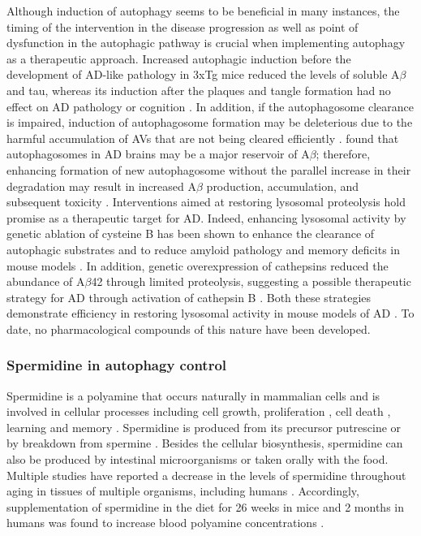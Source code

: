 Although induction of autophagy seems to be beneficial in many instances, the timing of the intervention in the disease progression as well as point of dysfunction in the autophagic pathway is crucial when implementing autophagy as a therapeutic approach. Increased autophagic induction before the development of AD-like pathology in 3xTg mice reduced the levels of soluble A$\beta$ and tau, whereas its induction after the plaques and tangle formation had no effect on AD pathology or cognition \citep{Majumder2011}. In addition, if the autophagosome clearance is impaired, induction of autophagosome formation may be deleterious due to the harmful accumulation of AVs that are not being cleared efficiently \citep{Liang2014}. \citet{Yu2005} found that autophagosomes in AD brains may be a major reservoir of A$\beta$; therefore, enhancing formation of new autophagosome without the parallel increase in their degradation may result in increased A$\beta$ production, accumulation, and subsequent toxicity \citep{Nixon2007}. Interventions aimed at restoring lysosomal proteolysis hold promise as a therapeutic target for AD. Indeed, enhancing lysosomal activity by genetic ablation of cysteine B has been shown to enhance the clearance of autophagic substrates and to reduce amyloid pathology and memory deficits in mouse models \citep{Yang2011a,Yang2011b}. In addition, genetic overexpression of cathepsins reduced the abundance of A$\beta$42 through limited proteolysis, suggesting a possible therapeutic strategy for AD through activation of cathepsin B \citep{Mueller-Steiner2006}. Both these strategies demonstrate efficiency in restoring lysosomal activity in mouse models of AD \citep{Sun2008,Yang2011a,Yang2011b}. To date, no pharmacological compounds of this nature have been developed. 

\subsubsection{Spermidine in autophagy control}
Spermidine is a polyamine that occurs naturally in mammalian cells and is involved in cellular processes including cell growth, proliferation \citep{Gonzalez-Polo2015,Madeo2018,Minois2014}, cell death \citep{Igarashi2010,Pegg2016}, learning and memory \citep{Guerra2016}. Spermidine is produced from its precursor putrescine or by breakdown from spermine \citep{Madeo2018}. Besides the cellular biosynthesis, spermidine can also be produced by intestinal microorganisms or taken orally with the food. Multiple studies have reported a decrease in the levels of spermidine throughout aging in tissues of multiple organisms, including humans \citep{Eisenberg2009,Gupta2013,Pucciarelli2012,Scalabrino1984}. Accordingly, supplementation of spermidine in the diet for 26 weeks in mice and 2 months in humans was found to increase blood polyamine concentrations \citep{Soda2009,Soda2013}.

